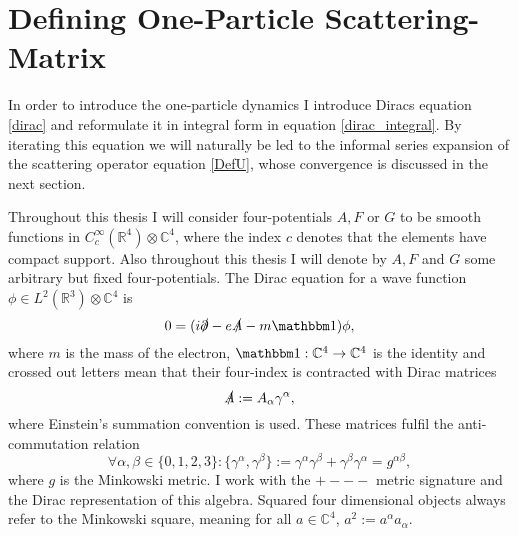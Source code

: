 \documentclass[b5paper,draft,openbib,12pt]{memoir}
\newcommand{\id}{{\mathbbm 1}}
\begin{document}
\section{Defining One-Particle Scattering-Matrix}\label{sec:one-particle}


In order to introduce the one-particle dynamics I introduce Diracs equation \eqref{dirac} and reformulate it in integral form in equation \eqref{dirac_integral}. By iterating this equation we will naturally be led to the informal series expansion of the scattering operator equation \eqref{DefU}, whose convergence is discussed in the next section. 

Throughout this thesis I will consider four-potentials $A, F$ or \(G\) to be smooth functions
in \(C_{c}^\infty(\mathbb{R}^4)\otimes \mathbb{C}^4\), where the index \(c\)
denotes that the elements have compact support. Also throughout this thesis I
will denote by \(A, F\) and \(G\) some arbitrary but fixed four-potentials. The Dirac
equation for a wave function \(\phi \in L^2(\mathbb{R}^3)\otimes \mathbb{C}^4\)
is
\begin{equation}\label{dirac}
0= (i\slashed{\partial}-e\slashed{A}-m \id) \phi,
\end{equation}
where \(m\) is the mass of the electron, \(\id: \mathbb{C}^4\rightarrow \mathbb{C}^4\) is the identity  and crossed out letters mean that their four-index is contracted with Dirac matrices
\begin{equation}
\slashed{A}:= A_\alpha \gamma^\alpha,
\end{equation}
where Einstein's summation convention is used. These matrices fulfil the anti-commutation relation
\begin{equation}
\forall \alpha, \beta \in \{0,1,2,3\}:\{\gamma^\alpha, \gamma^\beta\}:= \gamma^\alpha \gamma^\beta+ \gamma^\beta \gamma^\alpha= g^{\alpha \beta},
\end{equation}
where \(g\) is the Minkowski metric. I work with the \(+---\) metric signature and the Dirac representation of this algebra. Squared four dimensional objects always refer to the Minkowski square, meaning for all \(a\in \mathbb{C}^4\), \(a^2:= a^{\alpha} a_{\alpha}\). 
\end{document}
